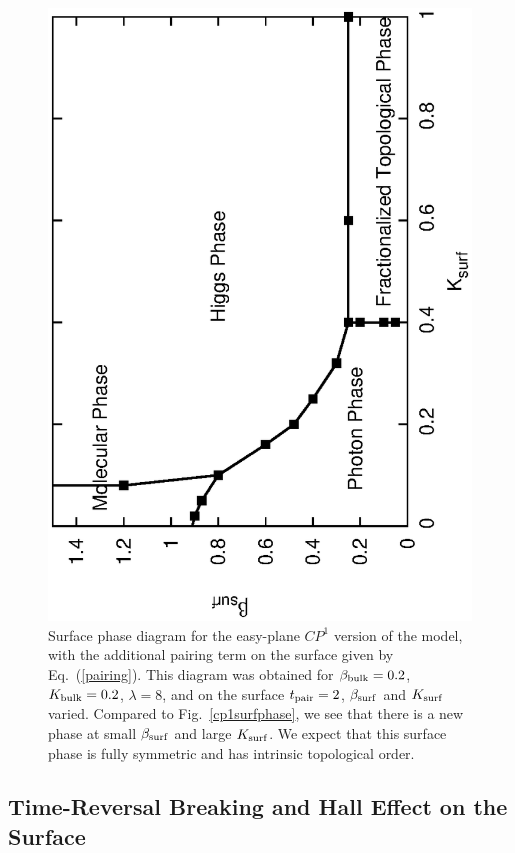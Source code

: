 \documentclass[prb,twocolumn]{revtex4-1}
\begin{document}
\begin{figure}
\includegraphics[angle=-90,width=\linewidth]{figures/cp1surfacepairing.eps}
\caption{Surface phase diagram for the easy-plane $CP^1$ version of the model, with the additional pairing term on the surface given by Eq.~(\ref{pairing}). This diagram was obtained for $\beta_{\rm bulk}=0.2$, $K_{\rm bulk}=0.2$, $\lambda=8$, and on the surface $t_{\rm pair}=2$, $\beta_{\rm surf}$ and $K_{\rm surf}$ varied. Compared to Fig.~\ref{cp1surfphase}, we see that there is a new phase at small $\beta_{\rm surf}$ and large $K_{\rm surf}$.  We expect that this surface phase is fully symmetric and has intrinsic topological order.
}
\label{cp1surfpair}
\end{figure}

\subsection{Time-Reversal Breaking and Hall Effect on the Surface}
\label{cp1Hall}
\end{document}
